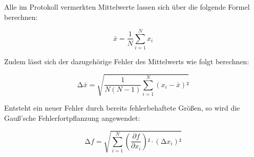 Alle im Protokoll vermerkten Mittelwerte lassen sich über die folgende Formel berechnen:

\begin{equation}
\label{eqn:Mittelwert}
    \bar{x} = \frac{1}{N}\sum_{i=1}^N x_i
\end{equation}

Zudem lässt sich der dazugehörige Fehler des Mittelwerts wie folgt berechnen:

\begin{equation}
\label{eqn:Mittelwertfehler}
    \increment \bar{x} = \sqrt{\frac{1}{N\left(N-1\right)}\sum_{i=1}^N \left(x_i - \bar{x}\right)²}
\end{equation}

Entsteht ein neuer Fehler durch bereits fehlerbehaftete Größen, so wird die Gauß'sche Fehlerfortpflanzung angewendet:

\begin{equation}
    \increment f = \sqrt{\sum_{i=1}^N \left(\frac{\partial f}{\partial x_i}\right)²\cdot\left(\increment x_i\right)²}
\end{equation}




